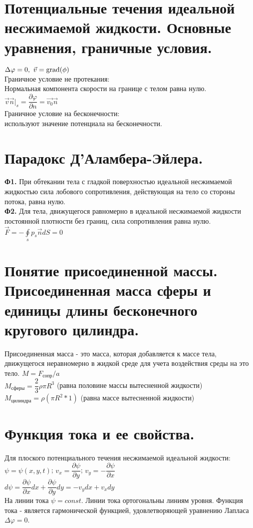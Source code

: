 \begin{multicols*}{2}
		\section{Потенциальные течения идеальной несжимаемой жидкости. Основные уравнения, граничные условия.}
		$\Delta \varphi=0,~\vec{v}=\operatorname{grad}(\phi)$ \\
		Граничное условие не протекания: \\
		Нормальная компонента скорости на границе с телом равна нулю.\\
		$\vec{v}\vec{n}|_s=\dfrac{\partial\varphi}{\partial n}=\vec{v_0}\vec{n}$ \\
		Граничное условие на бесконечности: \\
		используют значение потенциала на бесконечности.\\
		
		\section{Парадокс Д’Аламбера-Эйлера.}
		\textbf{Ф1.} При обтекании тела с гладкой поверхностью идеальной
		несжимаемой жидкостью сила лобового сопротивления, действующая на тело
		со стороны потока, равна нулю. \\
		\textbf{Ф2.} Для тела, движущегося равномерно в идеальной несжимаемой жидкости постоянной плотности без границ, сила сопротивления равна
		нулю.\\
		$\vec{F}=-\oint\limits_sp_s\vec{n}dS=0$
		
		\section{Понятие присоединенной массы. Присоединенная масса сферы и единицы длины бесконечного кругового цилиндра.}
		Присоединенная масса - это масса, которая добавляется к массе тела, движущегося неравномерно в жидкой среде для учета воздействия среды на это тело.
		$M=F_\text{сопр}/a$ \\
		$M_\text{сферы}=\dfrac{2}{3}\rho\pi R^3$ (равна половине массы вытесненной жидкости)\\
		$M_\text{цилиндра}=\rho(\pi R^2*1)$ (равна массе вытесненной жидкости)
		
		\section{Функция тока и ее свойства.}
		Для плоского потенциального течения несжимаемой идеальной жидкости: \\
		$\psi = \psi (x, y, t)$; $v_{x}=\dfrac{\partial\psi}{\partial y}$; $v_{y}=-\dfrac{\partial\psi}{\partial x}$ \\
		$d\psi = \dfrac{\partial\psi}{\partial x}dx + \dfrac{\partial\psi}{\partial y}dy = -v_{y}dx + v_{x}dy$\\
		На линии тока $\psi = const$. Линии тока ортогональны линиям уровня. Функция тока - является гармонической функцией, удовлетворяющей уравнению Лапласа $\Delta \varphi = 0$. 
		

\end{multicols*}
